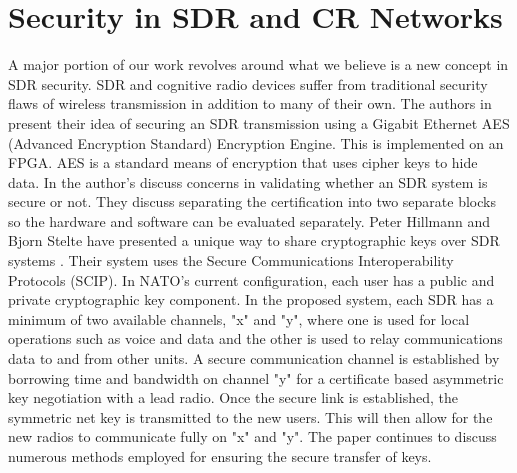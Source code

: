 \section{Security in SDR and CR Networks}

A major portion of our work revolves around what we believe is a new concept in SDR security. SDR and 
cognitive radio devices suffer from traditional security flaws of wireless transmission in addition to
many of their own. The authors in \cite{1400381} present their idea of securing an SDR transmission
using a Gigabit Ethernet AES (Advanced Encryption Standard) Encryption Engine.  This is implemented on 
an FPGA. AES is a standard means of encryption that uses cipher keys to hide data. In \cite{1285401} the 
author's discuss concerns in validating whether an SDR system is secure or not. They discuss separating the 
certification into two separate blocks so the hardware and software can be evaluated separately. Peter Hillmann and Bjorn Stelte have presented a unique way to share cryptographic keys over SDR systems \cite{6694489}. Their system uses the Secure Communications Interoperability Protocols (SCIP). In NATO's current
configuration, each user has a public and private cryptographic key component. In the proposed system, each SDR has a minimum of two available channels, "x" and "y", where one is used for local operations such as 
voice and data and the other is used to relay communications data to and from other units. A secure 
communication channel is established by borrowing time and bandwidth on channel "y" for a certificate
based asymmetric key negotiation with a lead radio. Once the secure link is established, the symmetric net
key is transmitted to the new users. This will then allow for the new radios to communicate fully on "x" and
"y". The paper continues to discuss numerous methods employed for ensuring the secure transfer 
of keys. 
